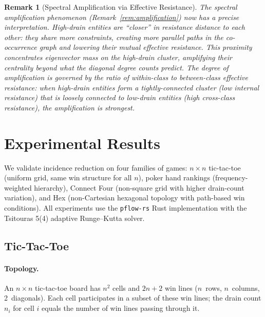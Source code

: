 \documentclass[11pt,a4paper]{article}
\newtheorem{remark}[theorem]{Remark}
\begin{document}
\begin{remark}[Spectral Amplification via Effective Resistance]\label{rem:resistance-amplification}
The spectral amplification phenomenon (Remark~\ref{rem:amplification}) now has a precise interpretation.
High-drain entities are ``closer'' in resistance distance to each other: they share more constraints, creating more parallel paths in the co-occurrence graph and lowering their mutual effective resistance.
This proximity concentrates eigenvector mass on the high-drain cluster, amplifying their centrality beyond what the diagonal degree counts predict.
The degree of amplification is governed by the ratio of within-class to between-class effective resistance: when high-drain entities form a tightly-connected cluster (low internal resistance) that is loosely connected to low-drain entities (high cross-class resistance), the amplification is strongest.
\end{remark}

\section{Experimental Results}
\label{sec:experiments}

We validate incidence reduction on four families of games: $n \times n$ tic-tac-toe (uniform grid, same win structure for all $n$), poker hand rankings (frequency-weighted hierarchy), Connect Four (non-square grid with higher drain-count variation), and Hex (non-Cartesian hexagonal topology with path-based win conditions).
All experiments use the \texttt{pflow-rs} Rust implementation with the Tsitouras 5(4) adaptive Runge--Kutta solver.

\subsection{Tic-Tac-Toe}
\label{sec:tictactoe}

\paragraph{Topology.}
An $n \times n$ tic-tac-toe board has $n^2$ cells and $2n + 2$ win lines ($n$~rows, $n$~columns, 2~diagonals).
Each cell participates in a subset of these win lines; the drain count $n_i$ for cell $i$ equals the number of win lines passing through it.
\end{document}
